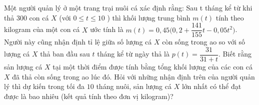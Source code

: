 \begin{bt}%
	Một người quản lý ở một trang trại nuôi cá xác định rằng: Sau t tháng kể từ khi thả $300$ con cá $X$ (với $0 \leq t\leq 10$ ) thì khối lượng trung bình $m(t)$ tính theo kilogram của một con cá $X$ ước tính là $m(t)=0{,}45\Big(0{,}2+\dfrac{141}{155}t-0{,}05t^2\Big)$. Người này cũng nhận định tỉ lệ giữa số lượng cá $X$ còn sống trong ao so với số lượng cá $X$ thả ban đầu sau $t$ tháng kể từ ngày thả là $p(t)=\dfrac{31}{31+t}$. Biết rằng sản lượng cá $X$ tại một thời điểm được tính bằng tổng khối lượng của các con cá $X$ đã thả còn sống trong ao lúc đó. Hỏi với những nhận định trên của người quản lý thì dự kiến trong tối đa $10$ tháng nuôi, sản lượng cá $X$ lớn nhất có thể đạt được là bao nhiêu (kết quả tính theo đơn vị kilogram)?
\end{bt}

